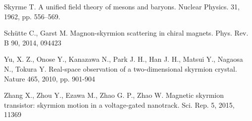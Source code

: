 \documentclass[a4paper,article,14pt]{extarticle}
\begin{document}
\begin{thebibliography}{1}
 Skyrme T. \flqq A unified field theory of mesons and baryons\frqq. Nuclear Physics. 31, 1962, pp. 556–569.

 Sch{\"u}tte C., Garst M. \flqq Magnon-skyrmion scattering in chiral magnets\frqq. Phys. Rev. B 90, 2014, 094423 

 Yu, X. Z., Onose Y., Kanazawa N., Park J. H., Han J. H., Matsui Y., Nagaosa N., Tokura Y. \flqq Real-space observation of a two-dimensional skyrmion crystal\frqq. Nature 465, 2010, pp. 901-904

 Zhang X., Zhou Y., Ezawa M., Zhao G. P., Zhao W. \flqq Magnetic skyrmion transistor: skyrmion motion in a voltage-gated nanotrack\frqq. Sci. Rep. 5, 2015, 11369

\end{thebibliography}
\end{document}
